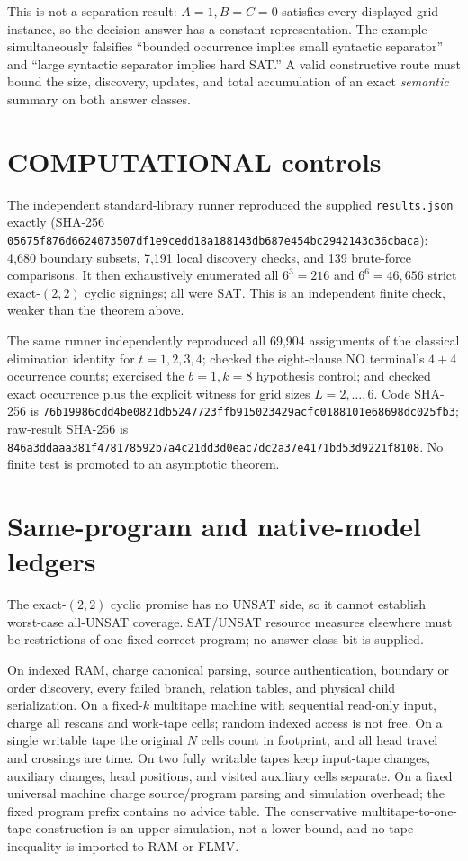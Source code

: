\documentclass[11pt]{article}
\begin{document}
This is not a separation result: $A=1,B=C=0$ satisfies every displayed grid
instance, so the decision answer has a constant representation.  The example
simultaneously falsifies ``bounded occurrence implies small syntactic
separator'' and ``large syntactic separator implies hard SAT.''  A valid
constructive route must bound the size, discovery, updates, and total
accumulation of an exact \emph{semantic} summary on both answer classes.

\section{COMPUTATIONAL controls}
The independent standard-library runner reproduced the supplied
\texttt{results.json} exactly (SHA-256
\texttt{05675f876d6624073507df1e9cedd18a188143db687e454bc2942143d36cbaca}):
4,680 boundary subsets, 7,191 local discovery checks, and 139 brute-force
comparisons.  It then exhaustively enumerated all $6^3=216$ and
$6^6=46,656$ strict exact-$(2,2)$ cyclic signings; all were SAT.  This is an
independent finite check, weaker than the theorem above.

The same runner independently reproduced all 69,904 assignments of the
classical elimination identity for $t=1,2,3,4$; checked the eight-clause NO
terminal's $4+4$ occurrence counts; exercised the $b=1,k=8$ hypothesis
control; and checked exact occurrence plus the explicit witness for grid
sizes $L=2,\ldots,6$.  Code SHA-256 is
\texttt{76b19986cdd4be0821db5247723ffb915023429acfc0188101e68698dc025fb3};
raw-result SHA-256 is
\texttt{846a3ddaaa381f478178592b7a4c21dd3d0eac7dc2a37e4171bd53d9221f8108}.
No finite test is promoted to an asymptotic theorem.

\section{Same-program and native-model ledgers}
The exact-$(2,2)$ cyclic promise has no UNSAT side, so it cannot establish
worst-case all-UNSAT coverage.  SAT/UNSAT resource measures elsewhere must be
restrictions of one fixed correct program; no answer-class bit is supplied.

On indexed RAM, charge canonical parsing, source authentication, boundary or
order discovery, every failed branch, relation tables, and physical child
serialization.  On a fixed-$k$ multitape machine with sequential read-only
input, charge all rescans and work-tape cells; random indexed access is not
free.  On a single writable tape the original $N$ cells count in footprint,
and all head travel and crossings are time.  On two fully writable tapes keep
input-tape changes, auxiliary changes, head positions, and visited auxiliary
cells separate.  On a fixed universal machine charge source/program parsing
and simulation overhead; the fixed program prefix contains no advice table.
The conservative multitape-to-one-tape construction is an upper simulation,
not a lower bound, and no tape inequality is imported to RAM or FLMV.
\end{document}
